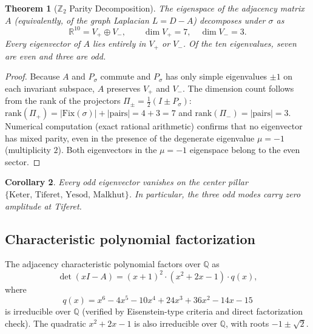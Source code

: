 \documentclass[11pt,a4paper]{amsart}
\newtheorem{theorem}{Theorem}[section]
\newtheorem{corollary}[theorem]{Corollary}
\theoremstyle{remark}
\newcommand{\bbZ}{\mathbb{Z}}
\newcommand{\bbR}{\mathbb{R}}
\newcommand{\bbQ}{\mathbb{Q}}
\newcommand{\rank}{\mathrm{rank}}
\begin{document}
\begin{theorem}[$\bbZ_2$ Parity Decomposition]
\label{thm:z2-decomp}
The eigenspace of the adjacency matrix $A$ (equivalently, of the graph
Laplacian $L = D - A$) decomposes under $\sigma$ as
\begin{equation}
\bbR^{10} = V_+ \oplus V_-, \qquad \dim V_+ = 7, \quad \dim V_- = 3.
\end{equation}
Every eigenvector of $A$ lies entirely in $V_+$ or $V_-$. Of the ten
eigenvalues, seven are even and three are odd.
\end{theorem}

\begin{proof}
Because $A$ and $P_\sigma$ commute and $P_\sigma$ has only simple eigenvalues
$\pm 1$ on each invariant subspace, $A$ preserves $V_+$ and $V_-$. The
dimension count follows from the rank of the projectors
$\Pi_\pm = \tfrac{1}{2}(I \pm P_\sigma)$:
$\rank(\Pi_+) = |\mathrm{Fix}(\sigma)| + |\text{pairs}| = 4 + 3 = 7$ and
$\rank(\Pi_-) = |\text{pairs}| = 3$. Numerical computation (exact rational
arithmetic) confirms that no eigenvector has mixed parity, even in the
presence of the degenerate eigenvalue $\mu = -1$ (multiplicity $2$). Both
eigenvectors in the $\mu = -1$ eigenspace belong to the even sector.
\end{proof}

\begin{corollary}
Every odd eigenvector vanishes on the center pillar
$\{\text{Keter, Tiferet, Yesod, Malkhut}\}$. In particular, the three odd
modes carry zero amplitude at Tiferet.
\end{corollary}

\subsection{Characteristic polynomial factorization}
\label{sec:char-poly}

The adjacency characteristic polynomial factors over $\bbQ$ as
\begin{equation}
\det(xI - A) = (x + 1)^2 \cdot (x^2 + 2x - 1) \cdot q(x),
\end{equation}
where
\begin{equation}
q(x) = x^6 - 4x^5 - 10x^4 + 24x^3 + 36x^2 - 14x - 15
\end{equation}
is irreducible over $\bbQ$ (verified by Eisenstein-type criteria and direct
factorization check). The quadratic $x^2 + 2x - 1$ is also irreducible over
$\bbQ$, with roots $-1 \pm \sqrt{2}$.
\end{document}
